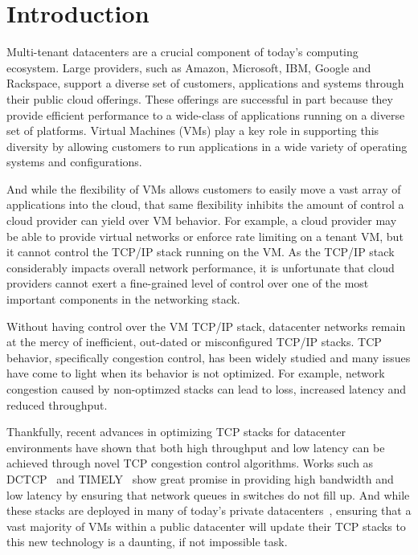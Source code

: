 \section{Introduction}
\label{intro}

Multi-tenant datacenters are a crucial component of today's computing ecosystem. Large providers, such as Amazon, Microsoft, IBM, Google and Rackspace, support
a diverse set of customers, applications and systems through their public cloud offerings. These offerings are successful in 
part because they provide efficient performance to a wide-class of applications running on a diverse set of platforms. Virtual
Machines (VMs) play a key role in supporting this diversity by allowing customers to run applications in a wide variety of 
operating systems and configurations.

And while the flexibility of VMs allows customers to easily move a vast array of applications into the cloud, that same flexibility inhibits the 
amount of control a cloud provider can yield over VM behavior. For example, a cloud provider may be able to provide virtual networks or enforce rate limiting
on a tenant VM, but it cannot control the TCP/IP stack running on the VM. As the TCP/IP stack considerably impacts overall network performance, it 
is unfortunate that cloud providers cannot exert a fine-grained level of control over one of the most important components in the networking stack.

Without having control over the VM TCP/IP stack, datacenter networks remain at the mercy of inefficient, out-dated or misconfigured TCP/IP stacks.
TCP behavior, specifically congestion control, has been widely studied and many issues have come to light when its behavior is not optimized. For example,
network congestion caused by non-optimzed stacks can lead to loss, increased latency and reduced throughput. 

Thankfully, recent advances in optimizing TCP stacks for datacenter environments have shown that both high throughput and low latency can be 
achieved through novel TCP congestion control algorithms. Works such as DCTCP~\cite{alizadeh2011data} and TIMELY~\cite{mittal2015timely} show great promise in providing high
bandwidth and low latency by ensuring that network queues in switches do not fill up. And while these stacks are deployed in many of today's 
private datacenters~\cite{singh2015jupiter,judd2015nsdi}, ensuring that a vast majority of VMs within a public datacenter will update their TCP stacks
to this new technology is a daunting, if not impossible task.

